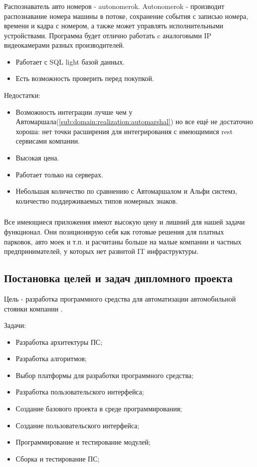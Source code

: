 \subsubsection{}
Распознаватель авто номеров - autonomerok. Autonomerok - производит распознавание номера машины в потоке, сохранение события с записью номера, времени и кадра с номером, а также может управлять исполнительными устройствами. Программа будет отлично работать c аналоговыми IP видеокамерами разных производителей.
\begin{itemize}
  \item Работает с SQL light базой данных.
  \item Есть возможность проверить перед покупкой.
\end{itemize}
Недостатки:
\begin{itemize}
  \item Возможность интеграции лучше чем у Автомаршала(\ref{sub:domain:realization:automarshal}) но все ещё не достаточно хороша: нет точки расширения для интегрирования с имеющимися rest сервисами компании.
  \item Высокая цена.
  \item Работает только на \windows{} серверах.
  \item Небольшая количество по сравнению с Автомаршалом и Альфи системз, количество поддерживаемых типов номерных знаков.
\end{itemize}

\subsubsection{} Все имеющиеся приложения имеют высокую цену и лишний для нашей задачи функционал. Они позиционирую себя как готовые решения для платных парковок, авто моек и т.п. и расчитаны больше на малые компании и частных предпринимателей, у которых нет развитой IT инфраструктуры. 

\subsection{Постановка целей и задач дипломного проекта}
Цель - разработка программного средства для автоматизации автомобильной стоянки компании \company{}.


Задачи:
\begin{itemize}
  \item Разработка архитектуры ПС;
  \item Разработка алгоритмов;
  \item Выбор платформы для разработки программного средства;
  \item Разработка пользовательского интерфейса;
  \item Создание базового проекта в среде программирования;
  \item Создание пользовательского интерфейса;
  \item Программирование и тестирование модулей;
  \item Сборка и тестирование ПС;
\end{itemize}
